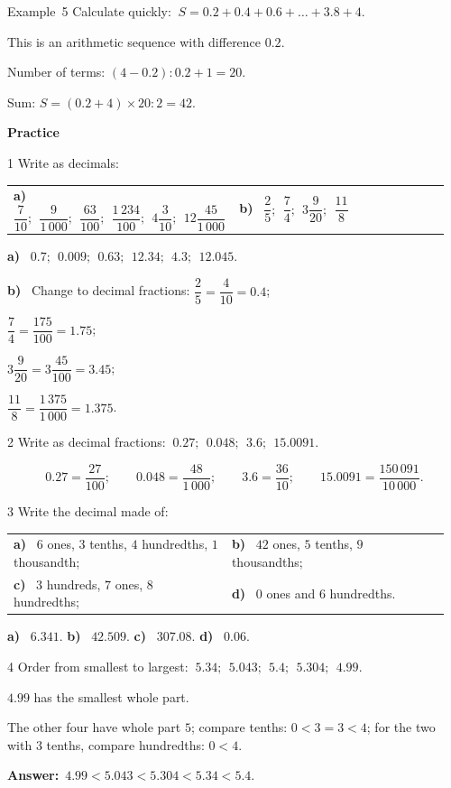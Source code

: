 \documentclass[11pt]{article}
\makeatletter
\newif\ifsol \solfalse
\renewcommand{\arraystretch}{1.35}
\providecommand{\AnsWord}{Đáp số}
\newcommand{\dapso}[1]{\par\textbf{\AnsWord:}\ #1}
\newcommand{\guide}{\par\vspace{4pt}{\bfseries\color{tmBlue}\GuideWord}\par\vspace{3pt}\nopagebreak}
\newcommand{\probsol}[1]{%
  \begin{lrbox}{\solmeasure}\begin{minipage}{\dimexpr\linewidth-24pt\relax}#1\end{minipage}\end{lrbox}%
  \ifsol
    \begin{solbox}#1\end{solbox}%
  \else
    \setlength{\solht}{\dimexpr\ht\solmeasure+\dp\solmeasure+0.85cm\relax}%
    \ifdim\solht<1.35cm\setlength{\solht}{1.35cm}\fi
    \begin{tcolorbox}[colback=white,colframe=Line,boxrule=0.8pt,arc=5pt,
      left=8pt,right=8pt,top=4pt,bottom=4pt,height=\solht]{\footnotesize\color{Slate}\itshape\WorkWord}\end{tcolorbox}%
  \fi}
\newcommand{\dividerbar}[1]{\par\vspace{0.6em}\noindent
  \begin{tcolorbox}[enhanced,frame hidden,interior hidden,borderline west={5pt}{0pt}{ProbBlue},
    colback=white,left=12pt,right=12pt,top=5pt,bottom=5pt,arc=4pt]
  {\large\bfseries\color{ProbBlue} #1}\end{tcolorbox}\vspace{0.4em}}
\newcommand{\pa}[1]{\textbf{#1)}\ }
\newenvironment{cols2}{\par\vspace{3pt}\noindent\setlength{\tabcolsep}{0pt}\renewcommand{\arraystretch}{1.3}%
  \begin{tabular}{@{}>{\raggedright\arraybackslash\rule{0pt}{4.4ex}}p{0.48\linewidth}<{\rule[-2.3ex]{0pt}{0pt}}@{\hspace{0.03\linewidth}}>{\raggedright\arraybackslash\rule{0pt}{4.4ex}}p{0.48\linewidth}<{\rule[-2.3ex]{0pt}{0pt}}@{}}}%
  {\end{tabular}\par}
\newcommand{\gap}{\vspace{0.3cm}}
\def\GuideWord{Guided solution.}
\def\WorkWord{Your work:}
\def\AnsWord{Answer}
\def\ExWord{Example}
\makeatother
\begin{document}
\gap
\begin{exbox}{\ExWord\ 5}
Calculate quickly: $\ S=0.2+0.4+0.6+\dots+3.8+4$.
\guide
This is an arithmetic sequence with difference $0.2$.\par Number of terms: $(4-0.2):0.2+1=20$.\par
Sum: $S=(0.2+4)\times20:2=42$.
\end{exbox}
\dividerbar{Practice}
\begin{probbox}{1}{\relax}
Write as decimals:
\begin{cols2}
\pa{a} $\dfrac7{10};\ \ \dfrac9{1\,000};\ \ \dfrac{63}{100};\ \ \dfrac{1\,234}{100};\ \ 4\dfrac3{10};\ \ 12\dfrac{45}{1\,000}$ & \pa{b} $\dfrac25;\ \ \dfrac74;\ \ 3\dfrac9{20};\ \ \dfrac{11}8$
\end{cols2}
\end{probbox}
\probsol{
\pa{a} $0.7;\ \ 0.009;\ \ 0.63;\ \ 12.34;\ \ 4.3;\ \ 12.045$.\par
\pa{b} Change to decimal fractions: $\dfrac25=\dfrac4{10}=0.4$;\par $\dfrac74=\dfrac{175}{100}=1.75$;\par $3\dfrac9{20}=3\dfrac{45}{100}=3.45$;\par $\dfrac{11}8=\dfrac{1\,375}{1\,000}=1.375$.
}
\gap
\begin{probbox}{2}{\relax}
Write as decimal fractions: $\ 0.27;\ \ 0.048;\ \ 3.6;\ \ 15.0091$.
\end{probbox}
\probsol{
\[0.27=\frac{27}{100};\qquad0.048=\frac{48}{1\,000};\qquad3.6=\frac{36}{10};\qquad15.0091=\frac{150\,091}{10\,000}.\]
}
\gap
\begin{probbox}{3}{\relax}
Write the decimal made of:
\begin{cols2}
\pa{a} $6$ ones, $3$ tenths, $4$ hundredths, $1$ thousandth; & \pa{b} $42$ ones, $5$ tenths, $9$ thousandths;\\
\pa{c} $3$ hundreds, $7$ ones, $8$ hundredths; & \pa{d} $0$ ones and $6$ hundredths.
\end{cols2}
\end{probbox}
\probsol{
\pa{a} $6.341$. \qquad \pa{b} $42.509$. \qquad \pa{c} $307.08$. \qquad \pa{d} $0.06$.
}
\gap
\begin{probbox}{4}{\relax}
Order from smallest to largest: $\ 5.34;\ \ 5.043;\ \ 5.4;\ \ 5.304;\ \ 4.99$.
\end{probbox}
\probsol{
$4.99$ has the smallest whole part.\par The other four have whole part $5$; compare tenths: $0<3=3<4$; for the two with $3$ tenths, compare hundredths: $0<4$.
\dapso{$4.99<5.043<5.304<5.34<5.4$.}}
\end{document}
